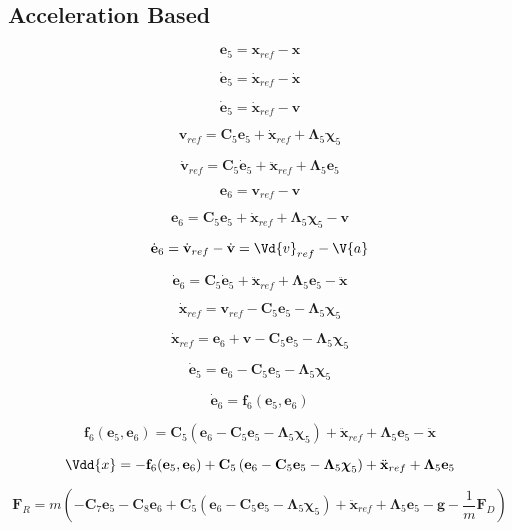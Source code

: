 \subsection{Acceleration Based}

\[
\mathbf{e}_5 = \mathbf{x}_{ref} - \mathbf{x}
\]

\[
\dot{\mathbf{e}}_5 = \dot{\mathbf{x}}_{ref} - \dot{\mathbf{x}}
\]

\[
\dot{\mathbf{e}}_5 = \dot{\mathbf{x}}_{ref} - \mathbf{v}
\]

\[
\mathbf{v}_{ref} = \mathbf{C}_5 \mathbf{e}_5 + \dot{\mathbf{x}}_{ref} + \boldsymbol\Lambda_5 \boldsymbol\chi_5
\]

\[
\dot{\mathbf{v}}_{ref} = \mathbf{C}_5 \dot{\mathbf{e}}_5 + \ddot{\mathbf{x}}_{ref} + \boldsymbol\Lambda_5 \mathbf{e}_5
\]


\[
\mathbf{e}_6 = \mathbf{v}_{ref} - \mathbf{v}
\]

\[
\mathbf{e}_6 = \mathbf{C}_5 \mathbf{e}_5 + \dot{\mathbf{x}}_{ref} + \boldsymbol\Lambda_5 \boldsymbol\chi_5 - \mathbf{v}
\]

\[
\dot{\mathbf{e}}_6 = \dot{\mathbf{v}}_{ref} - \dot{\mathbf{v}} = \Vd{v}_{ref} - \V{a}
\]

\[
\dot{\mathbf{e}}_6 = \mathbf{C}_5 \dot{\mathbf{e}}_5 + \ddot{\mathbf{x}}_{ref} + \boldsymbol\Lambda_5 \mathbf{e}_5 - \ddot{\mathbf{x}}
\]

\[
\dot{\mathbf{x}}_{ref} = \mathbf{v}_{ref} - \mathbf{C}_5 \mathbf{e}_5 - \boldsymbol\Lambda_5 \boldsymbol\chi_5
\]

\[
\dot{\mathbf{x}}_{ref} = \mathbf{e}_6 + \mathbf{v} - \mathbf{C}_5 \mathbf{e}_5 - \boldsymbol\Lambda_5 \boldsymbol\chi_5
\]

\[
\dot{\mathbf{e}}_5 = \mathbf{e}_6 - \mathbf{C}_5 \mathbf{e}_5 - \boldsymbol\Lambda_5 \boldsymbol\chi_5
\]

\[
\dot{\mathbf{e}}_6 = \mathbf{f}_6(\mathbf{e}_5,\mathbf{e}_6)
\]

\[
\mathbf{f}_6(\mathbf{e}_5,\mathbf{e}_6)
= \mathbf{C}_5 \left( \mathbf{e}_6 - \mathbf{C}_5 \mathbf{e}_5 - \boldsymbol\Lambda_5 \boldsymbol\chi_5 \right)
+ \ddot{\mathbf{x}}_{ref}
+ \boldsymbol\Lambda_5 \mathbf{e}_5
- \ddot{\mathbf{x}}
\]

\[
\Vdd{x}
= -\mathbf{f}_6(\mathbf{e}_5,\mathbf{e}_6)
+ \mathbf{C}_5 \left( \mathbf{e}_6 - \mathbf{C}_5 \mathbf{e}_5 - \boldsymbol\Lambda_5 \boldsymbol\chi_5 \right)
+ \ddot{\mathbf{x}}_{ref}
+ \boldsymbol\Lambda_5 \mathbf{e}_5
\]

\[
\mathbf{F}_{R}
= m \left(
	-\mathbf{C}_7 \mathbf{e}_5 - \mathbf{C}_8 \mathbf{e}_6
	+ \mathbf{C}_5 \left( \mathbf{e}_6 - \mathbf{C}_5 \mathbf{e}_5 - \boldsymbol\Lambda_5 \boldsymbol\chi_5 \right)
	+ \ddot{\mathbf{x}}_{ref}
	+ \boldsymbol\Lambda_5 \mathbf{e}_5
	- \mathbf{g}
	- \frac{1}{m} \mathbf{F}_{D}
\right)
\]

